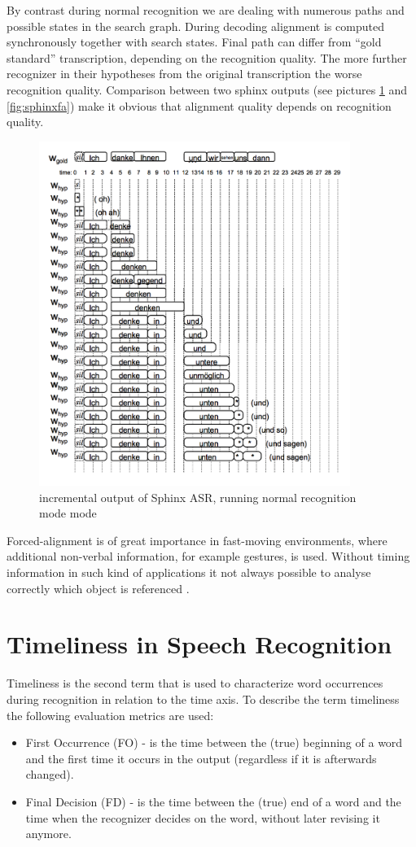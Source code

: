 By contrast during normal recognition we are dealing with numerous paths  and
possible states in the search graph. During decoding alignment
is computed synchronously together with search states. Final path can differ
from ``gold standard'' transcription, depending on the recognition quality. The
more further recognizer in their hypotheses from the original transcription the
worse recognition quality. Comparison between two sphinx outputs
(see pictures \ref {fig:sphinx} and \ref {fig:sphinxfa}) make it obvious that
alignment quality depends on recognition quality.
\begin{figure}[htbp]  
  \centering
   \includegraphics[width=0.9\textwidth]{images/sphinx_output.png}
  \caption{incremental output of Sphinx ASR, running normal recognition mode
  mode}
  \label{fig:sphinx}
\end{figure}
Forced-alignment is of great importance in fast-moving environments, where
additional non-verbal information, for example gestures, is used.  Without
timing information in such kind of applications it not always possible to
analyse correctly which object is referenced 
\parencite {Baumann2016}. 

\section {Timeliness in Speech Recognition} 
Timeliness is the second term that is used to characterize word
occurrences during recognition in relation to the time axis. 
To describe the term timeliness the following evaluation metrics are used:
\begin{itemize}
  \item First Occurrence (FO) - is the time between the (true) beginning of a
  word and the first time it occurs in the output (regardless if it is afterwards changed).
\item Final Decision (FD) - is the time between the (true) end of a word and the
time when the recognizer decides on the word, without later revising it anymore.
\end{itemize}

